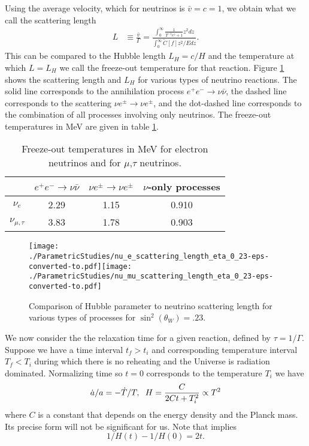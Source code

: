 Using the average velocity, which for neutrinos is $\bar v=c=1$, we obtain what we call the scattering length
\begin{align}
L&\equiv\frac{\bar v}{\Gamma}=\frac{\int_0^\infty\frac{1}{\Upsilon^{-1}e^z+1}z^2dz}{\int_0^\infty \tilde C[f] z^2/E dz}.
\end{align}
This can be compared to the Hubble length $L_H=c/H$ and the temperature at which $L=L_H$ we call the freeze-out temperature for that reaction.  Figure \ref{fig:scatt_length} shows the scattering length and $L_H$ for various types of neutrino reactions.  The solid line corresponds to the annihilation process $e^+e^-\rightarrow \nu\bar\nu$, the dashed line corresponds to the scattering $\nu e^\pm\rightarrow \nu e^\pm$, and the dot-dashed line corresponds to the combination of all processes involving only neutrinos.  The freeze-out temperatures in MeV are given in table \ref{table:freezeout_temp}.

\begin{table}[H]
\centering 
\begin{tabular}{|c|c|c|c|}
\hline
              & $e^+e^-\rightarrow \nu\bar\nu$ & $\nu e^\pm\rightarrow \nu e^\pm$ & $\nu$-only processes\\
\hline
$\nu_e$ &2.29 & 1.15&0.910\\
\hline
$\nu_{\mu,\tau}$ &3.83 & 1.78& 0.903\\
\hline
\end{tabular}
\caption{Freeze-out temperatures in MeV for electron neutrinos and for $\mu$,$\tau$ neutrinos.}
\label{table:freezeout_temp}
\end{table}

\begin{figure}[h]
\centerline{\texttt{[image: ./ParametricStudies/nu\_e\_scattering\_length\_eta\_0\_23-eps-converted-to.pdf]}\texttt{[image: ./ParametricStudies/nu\_mu\_scattering\_length\_eta\_0\_23-eps-converted-to.pdf]}}
\caption{Comparison of Hubble parameter to neutrino scattering length for various types of processes for $\sin^2(\theta_W)=.23$. }\label{fig:scatt_length}
 \end{figure}


We now consider the the relaxation time for a given reaction, defined by $\tau=1/\Gamma$.  Suppose we have a time interval $t_f>t_i$  and corresponding temperature interval $T_f<T_i$ during which there is no reheating and the Universe is radiation dominated.  Normalizing time so $t=0$ corresponds to the temperature $T_i$ we have
\begin{equation}\label{ch6:H_eq}
\dot a/a=-\dot T/T,\hspace{2mm} H=\frac{C}{2Ct+T_i^2}\propto T^2
\end{equation}
where $C$ is a constant that depends on the energy density and the Planck mass.  Its precise form will not be significant for us.  Note that  implies
\begin{equation}
1/H(t)-1/H(0)=2t.
\end{equation}

